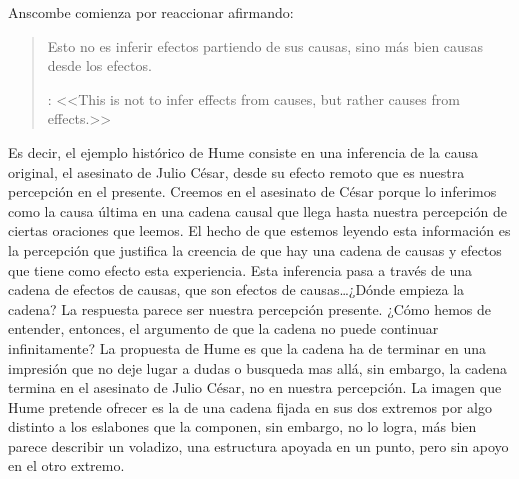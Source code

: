 Anscombe comienza por reaccionar afirmando: \blockquote[{\cite[86]{anscombe1981parmenides:humeandjulius}}: <<This is not to infer effects from causes, but rather causes from effects.>>]{Esto no es inferir efectos partiendo de sus causas, sino más bien causas desde los efectos.} Es decir, el ejemplo histórico de Hume consiste en una inferencia de la causa original, el asesinato de Julio César, desde su efecto remoto que es nuestra percepción en el presente. Creemos en el asesinato de César porque lo inferimos como la causa última en una cadena causal que llega hasta nuestra percepción de ciertas oraciones que leemos. El hecho de que estemos leyendo esta información es la percepción que justifica la creencia de que hay una cadena de causas y efectos que tiene como efecto esta experiencia. Esta inferencia pasa a través de una cadena de efectos de causas, que son efectos de causas\ldots ¿Dónde empieza la cadena? La respuesta parece ser nuestra percepción presente. ¿Cómo hemos de entender, entonces, el argumento de que la cadena no puede continuar infinitamente? La propuesta de Hume es que la cadena ha de terminar en una impresión que no deje lugar a dudas o busqueda mas allá, sin embargo, la cadena termina en el asesinato de Julio César, no en nuestra percepción. La imagen que Hume pretende ofrecer es la de una cadena fijada en sus dos extremos por algo distinto a los eslabones que la componen, sin embargo, no lo logra, más bien parece describir un voladizo, una estructura apoyada en un punto, pero sin apoyo en el otro extremo.

